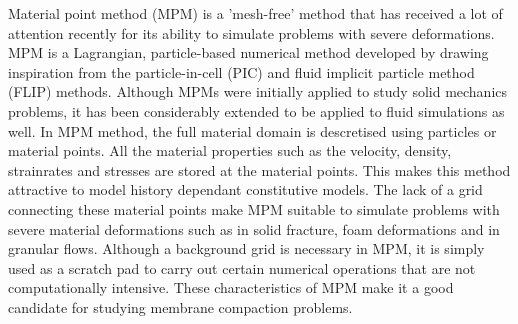 Material point method (MPM) \cite{SULSKY1994179, Bardenhagen2004, Zhang2015TheMP, Vaucorbeil} is a 'mesh-free' method that has received a lot of attention recently for its ability to simulate problems with severe deformations. MPM is a Lagrangian, particle-based numerical method developed by drawing inspiration from the particle-in-cell (PIC) \cite{osti_4769185} and fluid implicit particle method (FLIP) \cite{BRACKBILL1986314} methods. Although MPMs were initially applied to study solid mechanics problems, it has been considerably extended to be applied to fluid simulations as well. In MPM method, the full material domain is descretised using particles or material points. All the material properties such as the velocity, density, strainrates and stresses are stored at the material points. This makes this method attractive to model history dependant constitutive models. The lack of a grid connecting these material points make MPM suitable to simulate problems with severe material deformations such as in solid fracture, foam deformations and in granular flows. Although a background grid is necessary in MPM, it is simply used as a scratch pad to carry out certain numerical operations that are not computationally intensive. These characteristics of MPM make it a good candidate for studying membrane compaction problems.